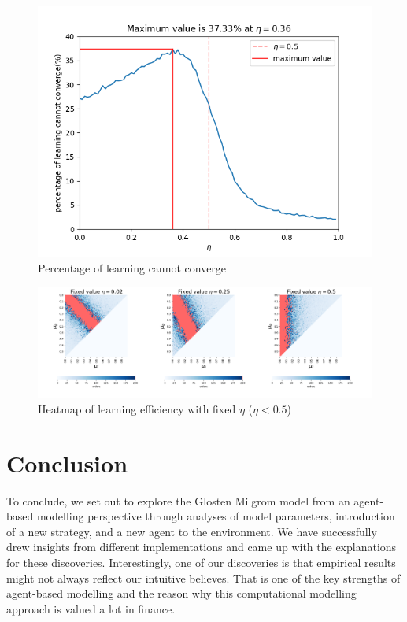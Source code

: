 \documentclass{article}
\begin{document}

\begin{figure}[ht]
    \centering
    \includegraphics[scale=0.8]{v3_fig9_plot_all_eta.png}
    \caption{Percentage of learning cannot converge}
    \label{fig:plot eta}
\end{figure}

\begin{figure}[ht]
    \centering
    \includegraphics[width=\textwidth]{v3_fig5_heatmap_fixed_eta_lt.png}
    \caption{Heatmap of learning efficiency with fixed $\eta$ ($\eta<0.5$)}
    \label{fig:fix eta_lt}
\end{figure}


\section{Conclusion}\label{conclusion}
To conclude, we set out to explore the Glosten Milgrom model from an agent-based modelling perspective through analyses of model parameters, introduction of a new strategy, and a new agent to the environment. We have successfully drew insights from different implementations and came up with the explanations for these discoveries. Interestingly, one of our discoveries is that empirical results might not always reflect our intuitive believes. That is one of the key strengths of agent-based modelling and the reason why this computational modelling approach is valued a lot in finance.



\nocite{*}
\end{document}
